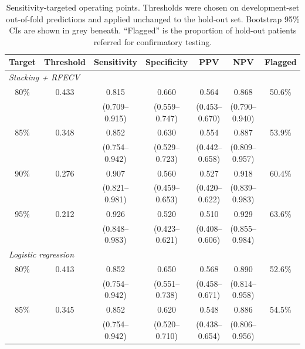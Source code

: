 \documentclass[preprint,12pt,authoryear=false]{elsarticle}
\begin{document}
\begin{table}[!htbp]
\centering
\caption{Sensitivity-targeted operating points. Thresholds were chosen on development-set out-of-fold predictions and applied unchanged to the hold-out set. Bootstrap 95\% CIs are shown in grey beneath. ``Flagged'' is the proportion of hold-out patients referred for confirmatory testing.}
\label{tab:thresholds}
\scriptsize
\setlength{\tabcolsep}{4pt}
\begin{tabular}{ccccccc}
\toprule
Target & Threshold & Sensitivity & Specificity & PPV & NPV & Flagged \\
\midrule
\multicolumn{7}{l}{\textit{Stacking + RFECV}} \\
80\% & 0.433 & 0.815 & 0.660 & 0.564 & 0.868 & 50.6\% \\
 &  & {\scriptsize\color{gray}(0.709--0.915)} & {\scriptsize\color{gray}(0.559--0.747)} & {\scriptsize\color{gray}(0.453--0.670)} & {\scriptsize\color{gray}(0.790--0.940)} &  \\[2pt]
85\% & 0.348 & 0.852 & 0.630 & 0.554 & 0.887 & 53.9\% \\
 &  & {\scriptsize\color{gray}(0.754--0.942)} & {\scriptsize\color{gray}(0.529--0.723)} & {\scriptsize\color{gray}(0.442--0.658)} & {\scriptsize\color{gray}(0.809--0.957)} &  \\[2pt]
90\% & 0.276 & 0.907 & 0.560 & 0.527 & 0.918 & 60.4\% \\
 &  & {\scriptsize\color{gray}(0.821--0.981)} & {\scriptsize\color{gray}(0.459--0.653)} & {\scriptsize\color{gray}(0.420--0.622)} & {\scriptsize\color{gray}(0.839--0.983)} &  \\[2pt]
95\% & 0.212 & 0.926 & 0.520 & 0.510 & 0.929 & 63.6\% \\
 &  & {\scriptsize\color{gray}(0.848--0.983)} & {\scriptsize\color{gray}(0.423--0.621)} & {\scriptsize\color{gray}(0.408--0.606)} & {\scriptsize\color{gray}(0.855--0.984)} &  \\[2pt]
\midrule
\multicolumn{7}{l}{\textit{Logistic regression}} \\
80\% & 0.413 & 0.852 & 0.650 & 0.568 & 0.890 & 52.6\% \\
 &  & {\scriptsize\color{gray}(0.754--0.942)} & {\scriptsize\color{gray}(0.551--0.738)} & {\scriptsize\color{gray}(0.458--0.671)} & {\scriptsize\color{gray}(0.814--0.958)} &  \\[2pt]
85\% & 0.345 & 0.852 & 0.620 & 0.548 & 0.886 & 54.5\% \\
 &  & {\scriptsize\color{gray}(0.754--0.942)} & {\scriptsize\color{gray}(0.520--0.710)} & {\scriptsize\color{gray}(0.438--0.654)} & {\scriptsize\color{gray}(0.806--0.956)} &  \\[2pt]

\end{tabular}
\end{table}
\end{document}
